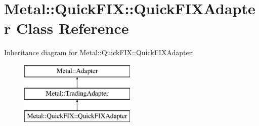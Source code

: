 \hypertarget{classMetal_1_1QuickFIX_1_1QuickFIXAdapter}{}\section{Metal\+:\+:Quick\+F\+I\+X\+:\+:Quick\+F\+I\+X\+Adapter Class Reference}
\label{classMetal_1_1QuickFIX_1_1QuickFIXAdapter}
Inheritance diagram for Metal\+:\+:Quick\+F\+I\+X\+:\+:Quick\+F\+I\+X\+Adapter\+:\begin{figure}[H]
\begin{center}
\leavevmode
\includegraphics[height=3.000000cm]{classMetal_1_1QuickFIX_1_1QuickFIXAdapter}
\end{center}
\end{figure}
